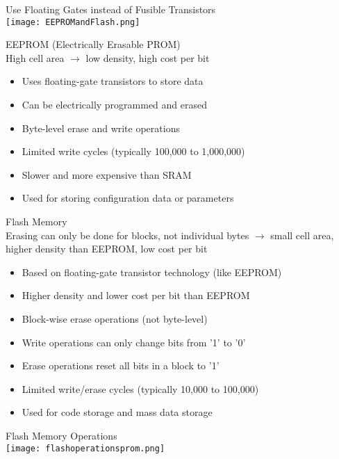 \begin{example2}{Use Floating Gates instead of Fusible Transistors}\\
    \texttt{[image: EEPROMandFlash.png]}
\end{example2}


\begin{concept}{EEPROM (Electrically Erasable PROM)}\\
    High cell area $\rightarrow$ low density, high cost per bit
\begin{itemize}
    \item Uses floating-gate transistors to store data
    \item Can be electrically programmed and erased
    \item Byte-level erase and write operations
    \item Limited write cycles (typically 100,000 to 1,000,000)
    \item Slower and more expensive than SRAM
    \item Used for storing configuration data or parameters
\end{itemize}
\end{concept}

\begin{concept}{Flash Memory}\\
    Erasing can only be done for blocks, not individual bytes $\rightarrow$ small cell area, higher density than EEPROM, low cost per bit
\begin{itemize}
    \item Based on floating-gate transistor technology (like EEPROM)
    \item Higher density and lower cost per bit than EEPROM
    \item Block-wise erase operations (not byte-level)
    \item Write operations can only change bits from '1' to '0'
    \item Erase operations reset all bits in a block to '1'
    \item Limited write/erase cycles (typically 10,000 to 100,000)
    \item Used for code storage and mass data storage
\end{itemize}
\end{concept}


\begin{corollary}{Flash Memory Operations}\\
    \texttt{[image: flashoperationsprom.png]}
\end{corollary}



